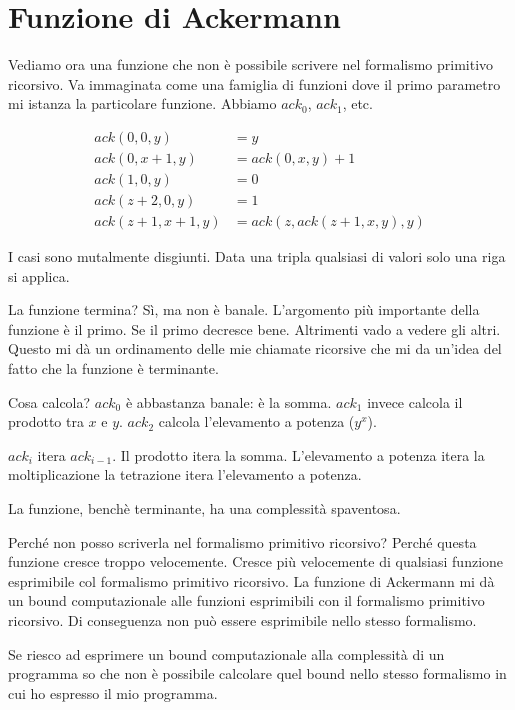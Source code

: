 \section{Funzione di Ackermann}

Vediamo ora una funzione che non è possibile scrivere nel formalismo primitivo ricorsivo. Va
immaginata come una famiglia di funzioni dove il primo parametro mi istanza la particolare funzione.
Abbiamo $\textit{ack}_{0}$, $\textit{ack}_{1}$, etc.

\begin{align*}
    \textit{ack}(0, 0, y ) &= y\\
    \textit{ack}(0, x + 1, y ) &= \textit{ack}(0, x, y ) + 1\\
    \textit{ack}(1, 0, y ) &= 0\\
    \textit{ack}(z + 2, 0, y ) &= 1\\
    \textit{ack}(z + 1, x + 1, y ) &= \textit{ack}(z, \textit{ack}(z + 1, x, y ), y )
\end{align*}

I casi sono mutalmente disgiunti. Data una tripla qualsiasi di valori solo una riga si applica.

La funzione termina? Sì, ma non è banale. L'argomento più importante della funzione è il primo.
Se il primo decresce bene. Altrimenti vado a vedere gli altri. Questo mi dà un ordinamento delle
mie chiamate ricorsive che mi da un'idea del fatto che la funzione è terminante.

Cosa calcola? $\textit{ack}_{0}$ è abbastanza banale: è la somma. $\textit{ack}_{1}$ invece
calcola il prodotto tra $x$ e $y$. $\textit{ack}_{2}$ calcola l'elevamento a potenza ($y^x$).

$\textit{ack}_{i}$ itera $\textit{ack}_{i-1}$. Il prodotto itera la somma. L'elevamento a potenza
itera la moltiplicazione la tetrazione itera l'elevamento a potenza.

La funzione, benchè terminante, ha una complessità spaventosa.

Perché non posso scriverla nel formalismo primitivo ricorsivo? Perché questa funzione cresce
troppo velocemente. Cresce più velocemente di qualsiasi funzione esprimibile col formalismo
primitivo ricorsivo. La funzione di Ackermann mi dà un bound computazionale alle funzioni
esprimibili con il formalismo primitivo ricorsivo. Di conseguenza non può essere esprimibile nello
stesso formalismo.

Se riesco ad esprimere un bound computazionale alla complessità di un programma so che non è
possibile calcolare quel bound nello stesso formalismo in cui ho espresso il mio programma.

